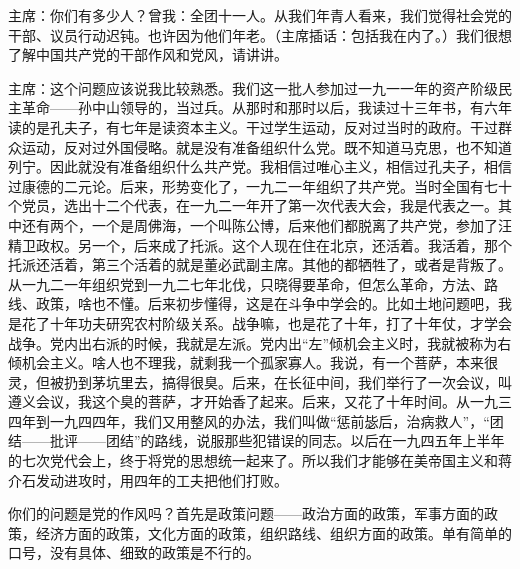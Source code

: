 主席：你们有多少人？曾我：全团十一人。从我们年青人看来，我们觉得社会党的干部、议员行动迟钝。也许因为他们年老。（主席插话：包括我在内了。）我们很想了解中国共产党的干部作风和党风，请讲讲。

主席：这个问题应该说我比较熟悉。我们这一批人参加过一九一一年的资产阶级民主革命——孙中山领导的，当过兵。从那时和那时以后，我读过十三年书，有六年读的是孔夫子，有七年是读资本主义。干过学生运动，反对过当时的政府。干过群众运动，反对过外国侵略。就是没有准备组织什么党。既不知道马克思，也不知道列宁。因此就没有准备组织什么共产党。我相信过唯心主义，相信过孔夫子，相信过康德的二元论。后来，形势变化了，一九二一年组织了共产党。当时全国有七十个党员，选出十二个代表，在一九二一年开了第一次代表大会，我是代表之一。其中还有两个，一个是周佛海，一个叫陈公博，后来他们都脱离了共产党，参加了汪精卫政权。另一个，后来成了托派。这个人现在住在北京，还活着。我活着，那个托派还活着，第三个活着的就是董必武副主席。其他的都牺牲了，或者是背叛了。从一九二一年组织党到一九二七年北伐，只晓得要革命，但怎么革命，方法、路线、政策，啥也不懂。后来初步懂得，这是在斗争中学会的。比如土地问题吧，我是花了十年功夫研究农村阶级关系。战争嘛，也是花了十年，打了十年仗，才学会战争。党内出右派的时候，我就是左派。党内出“左”倾机会主义时，我就被称为右倾机会主义。啥人也不理我，就剩我一个孤家寡人。我说，有一个菩萨，本来很灵，但被扔到茅坑里去，搞得很臭。后来，在长征中间，我们举行了一次会议，叫遵义会议，我这个臭的菩萨，才开始香了起来。后来，又花了十年时间。从一九三四年到一九四四年，我们又用整风的办法，我们叫做“惩前毖后，治病救人”，“团结——批评——团结”的路线，说服那些犯错误的同志。以后在一九四五年上半年的七次党代会上，终于将党的思想统一起来了。所以我们才能够在美帝国主义和蒋介石发动进攻时，用四年的工夫把他们打败。

你们的问题是党的作风吗？首先是政策问题——政治方面的政策，军事方面的政策，经济方面的政策，文化方面的政策，组织路线、组织方面的政策。单有简单的口号，没有具体、细致的政策是不行的。

